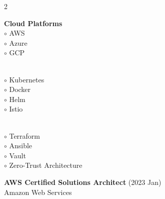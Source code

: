\documentclass{awesome-cv}
\begin{document}
\begin{paracol}{2}




{\linespread{0.7}\selectfont\textbf{\color{black}Cloud Platforms}\\[0.002em]

$\circ$ \color{text}AWS\\[-0.005em]
$\circ$ \color{text}Azure\\[-0.005em]
$\circ$ \color{text}GCP\\[-0.005em]}
\vspace{0.005em}





{\linespread{0.7}\selectfont\textbf{\color{black}}\\[0.002em]

$\circ$ \color{text}Kubernetes\\[-0.005em]
$\circ$ \color{text}Docker\\[-0.005em]
$\circ$ \color{text}Helm\\[-0.005em]
$\circ$ \color{text}Istio\\[-0.005em]}
\vspace{0.005em}





{\linespread{0.7}\selectfont\textbf{\color{black}}\\[0.002em]

$\circ$ \color{text}Terraform\\[-0.005em]
$\circ$ \color{text}Ansible\\[-0.005em]
$\circ$ \color{text}Vault\\[-0.005em]
$\circ$ \color{text}Zero-Trust Architecture\\[-0.005em]}
\vspace{0.005em}











\vspace{0.2em}


\textbf{\color{black}AWS Certified Solutions Architect} {\small\color{accent}(2023 Jan)}\\
{\small\color{text}Amazon Web Services}\\[0.2em]


\end{paracol}
\end{document}
